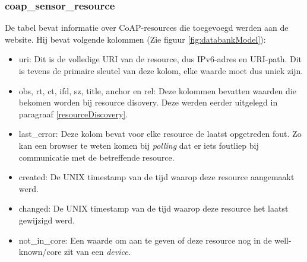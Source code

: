 \subsubsection{coap\_sensor\_resource}
De tabel bevat informatie over CoAP-resources die toegevoegd werden aan de website. Hij bevat volgende kolommen (Zie figuur \ref{fig:databankModel}):
\begin{itemize}
\item uri: Dit is de volledige URI van de resource, dus IPv6-adres en URI-path. Dit is tevens de primaire sleutel van deze kolom, elke waarde moet dus uniek zijn.
\item obs, rt, ct, ifd, sz, title, anchor en rel: Deze kolommen bevatten waarden die bekomen worden bij resource disovery. Deze werden eerder uitgelegd in paragraaf \ref{resourceDiscovery}.
\item last\_error: Deze kolom bevat voor elke resource de laatst opgetreden fout. Zo kan een browser te weten komen bij \textit{polling} dat er iets foutliep bij communicatie met de betreffende resource.
\item created: De UNIX timestamp van de tijd waarop deze resource aangemaakt werd.
\item changed: De UNIX timestamp van de tijd waarop deze resource het laatst gewijzigd werd.
\item not\_in\_core: Een waarde om aan te geven of deze resource nog in de well-known/core zit van een \textit{device}.
\end{itemize}
